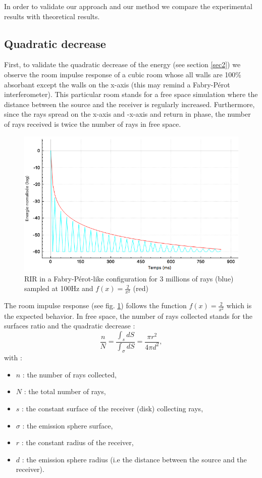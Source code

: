 \documentclass[AMA,STIX1COL]{WileyNJD-v2}
\begin{document}
In order to validate our approach and our method we compare the experimental results with theoretical results. 

\subsection{Quadratic decrease}
First, to validate the quadratic decrease of the energy (see section \ref{sec2}) we observe the room impulse response of a cubic room whose all walls are 100\% absorbant except the walls on the x-axis (this may remind a Fabry-P\'erot interferometer). This particular room stands for a free space simulation where the distance between the source and the receiver is regularly increased. Furthermore, since the rays spread on the x-axis and -x-axis and return in phase, the number of rays received is twice the number of rays in free space.
%
\begin{figure}[h]
\centering
	\includegraphics[width=0.6\linewidth]{test1}
	\caption{RIR in a Fabry-P\'erot-like configuration for 3 millions of rays (blue) sampled at 100Hz and $f(x)=\frac{2}{x^2}$ (red)}
	\label{test1}
\end{figure}
%
The room impulse response (see fig. \ref{test1}) follows the function $f(x)=\frac{2}{x^2}$ which is the expected behavior. In free space, the number of rays collected stands for the surfaces ratio and the quadratic decrease :
\begin{equation}
\frac{n}{N} = \frac{\int_s dS}{\int_{\sigma} dS} = \frac{\pi r^2}{4\pi d^2},
\end{equation}
with :
\begin{itemize}
\item$n$ : the number of rays collected,
\item$N$ : the total number of rays,
\item$s$ : the constant surface of the receiver (disk) collecting rays,
\item$\sigma$ : the emission sphere surface,
\item$r$ : the constant radius of the receiver,
\item$d$ : the emission sphere radius (i.e the distance between the source and the receiver).
\end{itemize}
\end{document}
